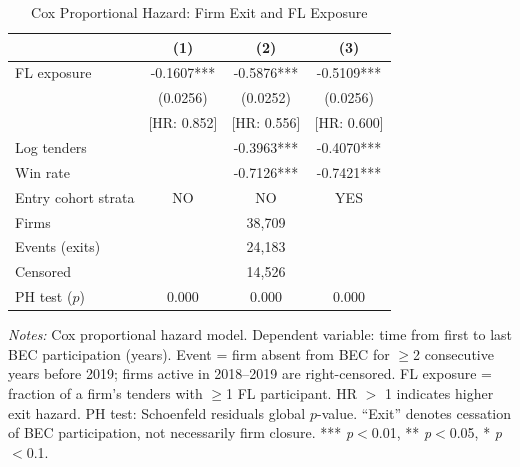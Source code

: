 \begin{table}[htbp]
\centering
\caption{Cox Proportional Hazard: Firm Exit and FL Exposure}
\label{tab:cox_survival}
\begin{threeparttable}
\small
\begin{tabular}{lccc}
\toprule
 & (1) & (2) & (3) \\
\midrule
FL exposure & -0.1607*** & -0.5876*** & -0.5109*** \\
 & (0.0256) & (0.0252) & (0.0256) \\
 & [HR: 0.852] & [HR: 0.556] & [HR: 0.600] \\
\midrule
Log tenders & & -0.3963*** & -0.4070*** \\
Win rate & & -0.7126*** & -0.7421*** \\
\midrule
Entry cohort strata & NO & NO & YES \\
Firms & \multicolumn{3}{c}{38,709} \\
Events (exits) & \multicolumn{3}{c}{24,183} \\
Censored & \multicolumn{3}{c}{14,526} \\
PH test ($p$) & 0.000 & 0.000 & 0.000 \\
\bottomrule
\end{tabular}
\begin{tablenotes}
\small
\item \textit{Notes:} Cox proportional hazard model. Dependent variable:
time from first to last BEC participation (years). Event = firm absent from
BEC for $\geq$2 consecutive years before 2019; firms active in 2018--2019 are
right-censored. FL exposure = fraction of a firm's tenders with $\geq$1 FL
participant. HR $>$ 1 indicates higher exit hazard. PH test: Schoenfeld
residuals global $p$-value.
``Exit'' denotes cessation of BEC participation, not necessarily firm closure.
*** \textit{p}$<$0.01, ** \textit{p}$<$0.05, * \textit{p}$<$0.1.
\end{tablenotes}
\end{threeparttable}
\end{table}

